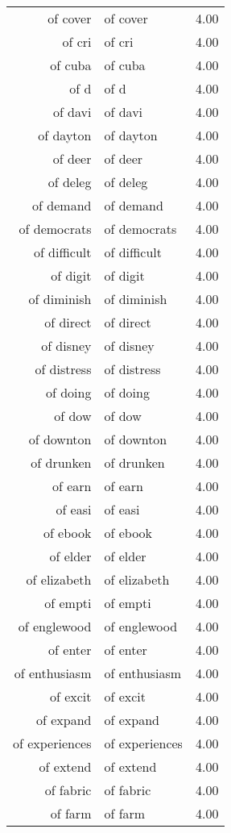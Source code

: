\begin{table}[ht]
\begin{tabular}{rlr}
  of cover & of cover & 4.00 \\ 
  of cri & of cri & 4.00 \\ 
  of cuba & of cuba & 4.00 \\ 
  of d & of d & 4.00 \\ 
  of davi & of davi & 4.00 \\ 
  of dayton & of dayton & 4.00 \\ 
  of deer & of deer & 4.00 \\ 
  of deleg & of deleg & 4.00 \\ 
  of demand & of demand & 4.00 \\ 
  of democrats & of democrats & 4.00 \\ 
  of difficult & of difficult & 4.00 \\ 
  of digit & of digit & 4.00 \\ 
  of diminish & of diminish & 4.00 \\ 
  of direct & of direct & 4.00 \\ 
  of disney & of disney & 4.00 \\ 
  of distress & of distress & 4.00 \\ 
  of doing & of doing & 4.00 \\ 
  of dow & of dow & 4.00 \\ 
  of downton & of downton & 4.00 \\ 
  of drunken & of drunken & 4.00 \\ 
  of earn & of earn & 4.00 \\ 
  of easi & of easi & 4.00 \\ 
  of ebook & of ebook & 4.00 \\ 
  of elder & of elder & 4.00 \\ 
  of elizabeth & of elizabeth & 4.00 \\ 
  of empti & of empti & 4.00 \\ 
  of englewood & of englewood & 4.00 \\ 
  of enter & of enter & 4.00 \\ 
  of enthusiasm & of enthusiasm & 4.00 \\ 
  of excit & of excit & 4.00 \\ 
  of expand & of expand & 4.00 \\ 
  of experiences & of experiences & 4.00 \\ 
  of extend & of extend & 4.00 \\ 
  of fabric & of fabric & 4.00 \\ 
  of farm & of farm & 4.00 \\ 

\end{tabular}
\end{table}
